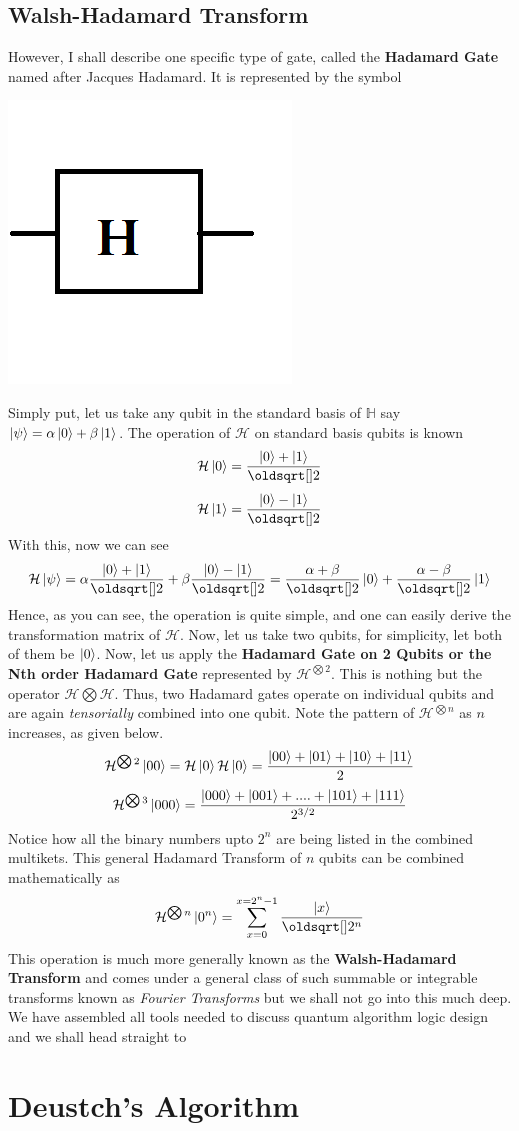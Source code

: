 \documentclass[12pt]{article}
\begin{document}
\subsection{Walsh-Hadamard Transform}
However, I shall describe one specific type of gate, called the \textbf{Hadamard Gate} named after Jacques Hadamard. It is represented by the symbol 
\begin{center}
\includegraphics[scale=0.5]{qhad.png}
\end{center}
Simply put, let us take any qubit in the standard basis of $\mathbb{H}$ say $\Ket{\psi} = \alpha\Ket{0} + \beta\Ket{1}$. The operation of $\mathcal{H}$ on standard basis qubits is known $$\mathcal{H}\Ket{0} = \frac{\Ket{0}+\Ket{1}}{\sqrt{2}}$$
$$\mathcal{H}\Ket{1} = \frac{\Ket{0}-\Ket{1}}{\sqrt{2}}$$
With this, now we can see
$$\mathcal{H}\Ket{\psi} = \alpha\frac{\Ket{0}+\Ket{1}}{\sqrt{2}} + \beta\frac{\Ket{0}-\Ket{1}}{\sqrt{2}} = \frac{\alpha + \beta}{\sqrt{2}}\Ket{0} + \frac{\alpha - \beta}{\sqrt{2}}\Ket{1}$$
Hence, as you can see, the operation is quite simple, and one can easily derive the transformation matrix of $\mathcal{H}$. Now, let us take two qubits, for simplicity, let both of them be $\Ket{0}$. Now, let us apply the \textbf{Hadamard Gate on 2 Qubits or the Nth order Hadamard Gate} represented by $\mathcal{H}^{\bigotimes 2}$. This is nothing but the operator $\mathcal{H}\bigotimes\mathcal{H}$. Thus, two Hadamard gates operate on individual qubits and are again \textit{tensorially} combined into one qubit. Note the pattern of $\mathcal{H}^{\bigotimes n}$ as $n$ increases, as given below.
$$\mathcal{H}^{\bigotimes 2}\Ket{00} = \mathcal{H}\Ket{0}\mathcal{H}\Ket{0} = \frac{\Ket{00}+\Ket{01}+\Ket{10}+\Ket{11}}{2}$$
$$\mathcal{H}^{\bigotimes 3}\Ket{000} = \frac{\Ket{000}+\Ket{001}+....+\Ket{101}+\Ket{111}}{2^{3/2}}$$ Notice how all the binary numbers upto $2^n$ are being listed in the combined multikets. This general Hadamard Transform of $n$ qubits can be combined mathematically as
$$\mathcal{H}^{\bigotimes n}\Ket{0^n} = \sum_{x=0}^{x=2^n-1}\frac{\Ket{x}}{\sqrt{2^n}}$$ This operation is much more generally known as the \textbf{Walsh-Hadamard Transform} and comes under a general class of such summable or integrable transforms known as \textit{Fourier Transforms} but we shall not go into this much deep. We have assembled all tools needed to discuss quantum algorithm logic design and we shall head straight to
\section{Deustch's Algorithm}
\end{document}
